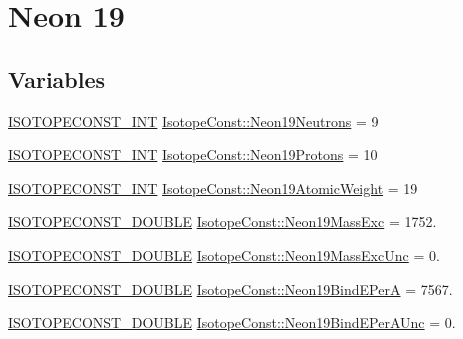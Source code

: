 \hypertarget{group___isotope_const-_neon-_ne19}{}\section{Neon 19}
\label{group___isotope_const-_neon-_ne19}
\subsection*{Variables}
\begin{DoxyCompactItemize}
\item 
\mbox{\hyperlink{group___isotope_const-_macros_ga5f18360b3e99483a35c32d789e62621c}{I\+S\+O\+T\+O\+P\+E\+C\+O\+N\+S\+T\+\_\+\+I\+NT}} \mbox{\hyperlink{group___isotope_const-_neon-_ne19_ga9bdd299750a63ff438fdfae1996cfcd2}{Isotope\+Const\+::\+Neon19\+Neutrons}} = 9
\item 
\mbox{\hyperlink{group___isotope_const-_macros_ga5f18360b3e99483a35c32d789e62621c}{I\+S\+O\+T\+O\+P\+E\+C\+O\+N\+S\+T\+\_\+\+I\+NT}} \mbox{\hyperlink{group___isotope_const-_neon-_ne19_ga5f6a3c030c2350a2eb088fbf3e5fc36c}{Isotope\+Const\+::\+Neon19\+Protons}} = 10
\item 
\mbox{\hyperlink{group___isotope_const-_macros_ga5f18360b3e99483a35c32d789e62621c}{I\+S\+O\+T\+O\+P\+E\+C\+O\+N\+S\+T\+\_\+\+I\+NT}} \mbox{\hyperlink{group___isotope_const-_neon-_ne19_ga7b4476dc167f3800843a59e84a88ff4f}{Isotope\+Const\+::\+Neon19\+Atomic\+Weight}} = 19
\item 
\mbox{\hyperlink{group___isotope_const-_macros_ga8f45a7272ce02c0b4c65c44636ed719a}{I\+S\+O\+T\+O\+P\+E\+C\+O\+N\+S\+T\+\_\+\+D\+O\+U\+B\+LE}} \mbox{\hyperlink{group___isotope_const-_neon-_ne19_ga1e1adb0a933de798968f8f9848dcf057}{Isotope\+Const\+::\+Neon19\+Mass\+Exc}} = 1752.
\item 
\mbox{\hyperlink{group___isotope_const-_macros_ga8f45a7272ce02c0b4c65c44636ed719a}{I\+S\+O\+T\+O\+P\+E\+C\+O\+N\+S\+T\+\_\+\+D\+O\+U\+B\+LE}} \mbox{\hyperlink{group___isotope_const-_neon-_ne19_ga83c75688110fd7fdb7c47f9ae8ba69c4}{Isotope\+Const\+::\+Neon19\+Mass\+Exc\+Unc}} = 0.
\item 
\mbox{\hyperlink{group___isotope_const-_macros_ga8f45a7272ce02c0b4c65c44636ed719a}{I\+S\+O\+T\+O\+P\+E\+C\+O\+N\+S\+T\+\_\+\+D\+O\+U\+B\+LE}} \mbox{\hyperlink{group___isotope_const-_neon-_ne19_ga5cc6fdbca80c885534f692b4e0e257a2}{Isotope\+Const\+::\+Neon19\+Bind\+E\+PerA}} = 7567.
\item 
\mbox{\hyperlink{group___isotope_const-_macros_ga8f45a7272ce02c0b4c65c44636ed719a}{I\+S\+O\+T\+O\+P\+E\+C\+O\+N\+S\+T\+\_\+\+D\+O\+U\+B\+LE}} \mbox{\hyperlink{group___isotope_const-_neon-_ne19_ga57b2cc765eecf9d520b26df111faee17}{Isotope\+Const\+::\+Neon19\+Bind\+E\+Per\+A\+Unc}} = 0.

\end{DoxyCompactItemize}
